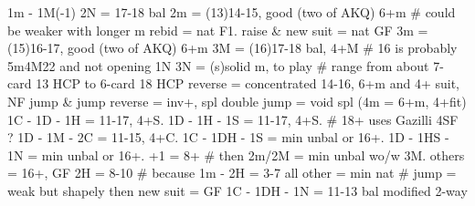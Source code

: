 1m - 1M(-1)
2N = 17-18 bal
2m = (13)14-15, good (two of AKQ) 6+m  # could be weaker with longer m
    rebid = nat F1. raise & new suit = nat GF
3m = (15)16-17, good (two of AKQ) 6+m
3M = (16)17-18 bal, 4+M  # 16 is probably 5m4M22 and not opening 1N
3N = (s)solid m, to play  # range from about 7-card 13 HCP to 6-card 18 HCP
reverse = concentrated 14-16, 6+m and 4+ suit, NF
jump & jump reverse = inv+, spl
double jump = void spl (4m = 6+m, 4+fit)
1C - 1D - 1H = 11-17, 4+S. 1D - 1H - 1S = 11-17, 4+S.  # 18+ uses Gazilli
    4SF ?
1D - 1M - 2C = 11-15, 4+C.
1C - 1DH - 1S = min unbal or 16+. 1D - 1HS - 1N = min unbal or 16+.
    +1 = 8+  # then 2m/2M = min unbal wo/w 3M. others = 16+, GF 
    2H = 8-10  # because 1m - 2H = 3-7
    all other = min nat  # jump = weak but shapely
        then new suit = GF
1C - 1DH - 1N = 11-13 bal
    modified 2-way